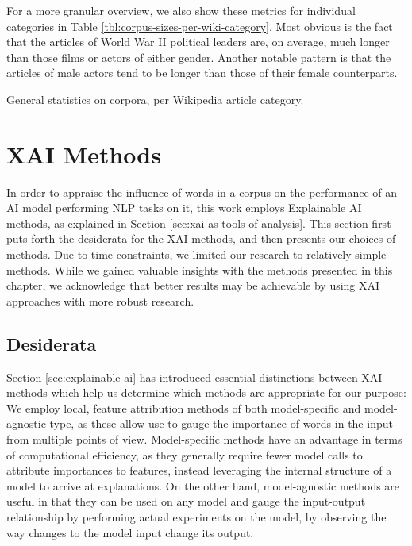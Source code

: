For a more granular overview, we also show these metrics for individual categories in Table \ref{tbl:corpus-sizes-per-wiki-category}.
Most obvious is the fact that the articles of World War II political leaders are, on average, much longer than those films or actors of either gender.
Another notable pattern is that the articles of male actors tend to be longer than those of their female counterparts.


\begin{table}[ht]
	\centering
	
	\caption{General statistics on corpora, per Wikipedia article category.}
	\label{tbl:corpus-sizes-per-wiki-category}
\end{table}

\section{XAI Methods} \label{sec:xai-methods}
In order to appraise the influence of words in a corpus on the performance of an AI model performing NLP tasks on it, this work employs Explainable AI methods, as explained in Section \ref{sec:xai-as-tools-of-analysis}.
This section first puts forth the desiderata for the XAI methods, and then presents our choices of methods.
Due to time constraints, we limited our research to relatively simple methods.
While we gained valuable insights with the methods presented in this chapter, we acknowledge that better results may be achievable by using XAI approaches with more robust research.

\subsection{Desiderata}
Section \ref{sec:explainable-ai} has introduced essential distinctions between XAI methods which help us determine which methods are appropriate for our purpose:
We employ local, feature attribution methods of both model-specific and model-agnostic type, as these allow use to gauge the importance of words in the input from multiple points of view.
Model-specific methods have an advantage in terms of computational efficiency, as they generally require fewer model calls to attribute importances to features, instead leveraging the internal structure of a model to arrive at explanations.
On the other hand, model-agnostic methods are useful in that they can be used on any model and gauge the input-output relationship by performing actual experiments on the model, by observing the way changes to the model input change its output.

